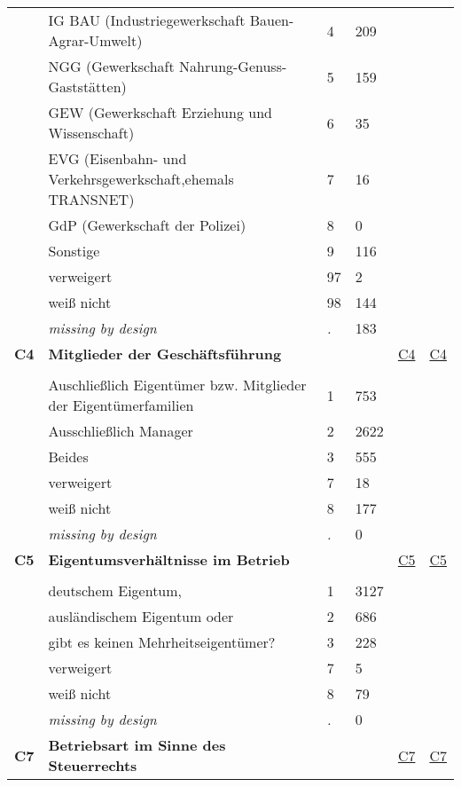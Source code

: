 \begin{longtable}{| L{2.45cm} | L{6cm} | C{1.5cm} | R{1cm} | C{2.25cm} | C{2.25cm} |}
   & IG BAU (Industriegewerkschaft Bauen-Agrar-Umwelt) & 4 & 209 &  &  \\ 
   & NGG (Gewerkschaft Nahrung-Genuss-Gaststätten) & 5 & 159 &  &  \\ 
   & GEW (Gewerkschaft Erziehung und Wissenschaft) & 6 & 35 &  &  \\ 
   & EVG (Eisenbahn- und Verkehrsgewerkschaft,ehemals TRANSNET) & 7 & 16 &  &  \\ 
   & GdP (Gewerkschaft der Polizei) & 8 & 0 &  &  \\ 
   & Sonstige & 9 & 116 &  &  \\ 
   & verweigert & 97 & 2 &  &  \\ 
   & weiß nicht & 98 & 144 &  &  \\ 
   & \textit{missing by design} & \textit{.} & 183 &  &  \\ 
   \midrule
\textbf{C4}\label{var:C4} & \textbf{Mitglieder der Geschäftsführung} &  &  & \hyperref[C4]{C4} & \hyperref[var:suf:C4]{C4} \\ 
   &  &  &  &  &  \\ 
   & Auschließlich Eigentümer bzw. Mitglieder der Eigentümerfamilien & 1 & 753 &  &  \\ 
   & Ausschließlich Manager & 2 & 2622 &  &  \\ 
   & Beides & 3 & 555 &  &  \\ 
   & verweigert & 7 & 18 &  &  \\ 
   & weiß nicht & 8 & 177 &  &  \\ 
   & \textit{missing by design} & \textit{.} & 0 &  &  \\ 
   \midrule
\textbf{C5}\label{var:C5} & \textbf{Eigentumsverhältnisse im Betrieb} &  &  & \hyperref[C5]{C5} & \hyperref[var:suf:C5]{C5} \\ 
   &  &  &  &  &  \\ 
   & deutschem Eigentum, & 1 & 3127 &  &  \\ 
   & ausländischem Eigentum oder & 2 & 686 &  &  \\ 
   & gibt es keinen Mehrheitseigentümer? & 3 & 228 &  &  \\ 
   & verweigert & 7 & 5 &  &  \\ 
   & weiß nicht & 8 & 79 &  &  \\ 
   & \textit{missing by design} & \textit{.} & 0 &  &  \\ 
   \midrule
\textbf{C7}\label{var:C7} & \textbf{Betriebsart im Sinne des Steuerrechts} &  &  & \hyperref[C7]{C7} & \hyperref[var:suf:C7]{C7} \\ 

\end{longtable}
